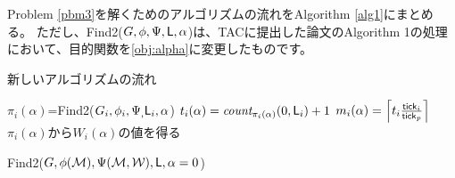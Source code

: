 \documentclass[ 10pt]{jsarticle}
\newcommand{\req}[1]{\eqref{#1}}
\newcommand{\tick}{{\sf tick}}
\newcommand{\Len}{{\sf L}}
\begin{document}
Problem \ref{pbm3}を解くためのアルゴリズムの流れをAlgorithm \ref{alg1}にまとめる。
ただし、Find2($G,\phi,\Psi,\Len,\alpha$)は、TACに提出した論文のAlgorithm 1の処理において、目的関数を\req{obj:alpha}に変更したものです。
\begin{algorithm}
\caption{新しいアルゴリズムの流れ} \label{alg1}
\begin{algorithmic}
%


	
	
		\State $\pi_i(\alpha)$=Find2($G_i,\phi_i,\Psi_,\Len_i,\alpha$)
		\State $t_i(\alpha)=\textit{count}_{\pi_i(\alpha)}(0,\Len_i)+1$
		\State $m_i(\alpha)=\left\lceil t_i\frac{\tick_i}{\tick_p} \right\rceil $
		\State $\pi_i(\alpha)$から$W_i(\alpha)$の値を得る 
		
	\EndFor
\EndFor
\State Find2($G,\phi(\mathcal{M}),\Psi(\mathcal{M},\mathcal{W}),\Len,\alpha=0$)
\end{algorithmic}
\end{algorithm}
%
%
\begin{comment}
%
\begin{enumerate}
\item
すべての$i\in\{1,\ldots,M\}$について、
\begin{enumerate}
\item\label{1-a}
下位TDES $G_i$のHard制約$\phi_i$を満たす実行列（execution）$\pi_i$を求める。
\item\label{1-b}
$\pi_i$から$\phi_i$を満たすのにかかった時間を求め、$t_i$とする
\end{enumerate}
\item\label{2}
それぞれの$i$について、$m_i=\left\lceil t_i\frac{\tick_i}{\tick_p} \right\rceil = \left\lceil \frac{t_i}{K_i}\right\rceil $を求める（$K_i$は提出した論文の式15で導入）
\item
$G$の仕様に$\bm{m}$の値を代入
\item
$G$の動作計画を行う
\end{enumerate}
%
%
%
\end{comment}
%
%
\end{document}
